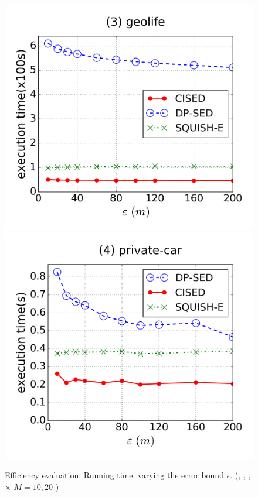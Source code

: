 \begin{figure}[tb!]
\includegraphics[scale = 0.250]{figures/Exp-time-epsilon-geolife.png}
\includegraphics[scale = 0.250]{figures/Exp-time-epsilon-private.png}
\vspace{-3ex}
\caption{\small Efficiency evaluation: Running time. varying the error bound $\epsilon$. (\cist, \cista, \dpa, \squishe  $\times$ $M = 10, {20}$ )}
\label{fig:time-epsilon}
\vspace{-1ex}
\end{figure}



